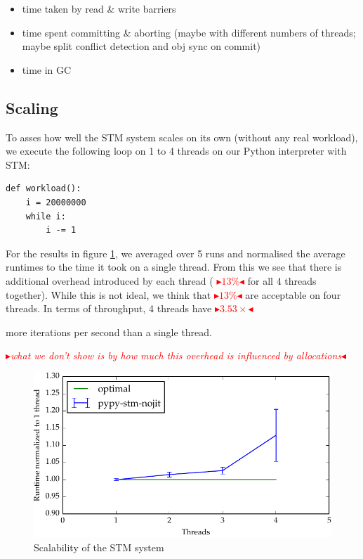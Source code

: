 \documentclass{sigplanconf}
\newcommand{\mynote}[2]{%
  \textcolor{red}{%
    \fbox{\bfseries\sffamily\scriptsize#1}%
    {\small$\blacktriangleright$\textsf{\emph{#2}}$\blacktriangleleft$}%
  }%
}
\newcommand\remi[1]{\mynote{Remi}{#1}}
\begin{document}
\begin{itemize}
\item time taken by read \& write barriers
\item time spent committing \& aborting (maybe with different numbers
  of threads; maybe split conflict detection and obj sync on commit)
\item time in GC
\end{itemize}


\subsection{Scaling}

To asses how well the STM system scales on its own (without any real
workload), we execute the following loop on 1 to 4 threads on our
Python interpreter with STM:
\begin{lstlisting}
def workload():
    i = 20000000
    while i:
        i -= 1
\end{lstlisting}

For the results in figure \ref{fig:scaling}, we averaged over 5 runs
and normalised the average runtimes to the time it took on a single
thread. From this we see that there is additional overhead introduced
by each thread (\remi{$13\%$} for all 4 threads together). While this
is not ideal, we think that \remi{$13\%$} are acceptable on four
threads. In terms of throughput, 4 threads have \remi{$3.53\times$}
more iterations per second than a single thread.

\remi{what we don't show is by how much this overhead is influenced
by allocations}

\begin{figure}[h]
  \centering
  \includegraphics[width=1\columnwidth]{plots/scaling.pdf}
  \caption{Scalability of the STM system\label{fig:scaling}}
\end{figure}
\end{document}
